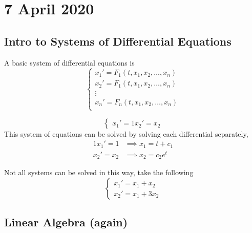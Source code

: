 \documentclass[diffeq.tex]{subfiles}
\begin{document}
\chapter{7 April 2020}
    \section{Intro to Systems of Differential Equations}
    \begin{definition}
        A basic system of differential equations is
        \begin{equation}
            \begin{cases}
                x_{1}' = F_{1}(t, x_{1}, x_{2}, \dots, x_{n})\\
                x_{2}' = F_{1}(t, x_{1}, x_{2}, \dots, x_{n})\\
                \vdots\\
                x_{n}' = F_{n}(t, x_{1}, x_{2}, \dots, x_{n})\\
            \end{cases}
        \end{equation}
    \end{definition}
    \begin{example}
        \begin{equation}
            \begin{cases}
                x_{1}' = 1
                x_{2}' = x_{2}
            \end{cases}
        \end{equation}
        This system of equations can be solved by solving each differential separately,
        \begin{alignat}{1}
            x_{1}' = 1 &\implies x_{1} = t + c_{1}\\
            x_{2}' = x_{2} &\implies x_{2} = c_{2}e^{t}
        \end{alignat}
    \end{example}
    \begin{example}
        Not all systems can be solved in this way, take the following
        \begin{equation}
            \begin{cases}
                x_{1}' = x_{1} + x_{2}\\
                x_{2}' = x_{1} + 3x_{2}
            \end{cases}
        \end{equation}
    \end{example}
    \np
    \section{Linear Algebra (again)}
\end{document}
